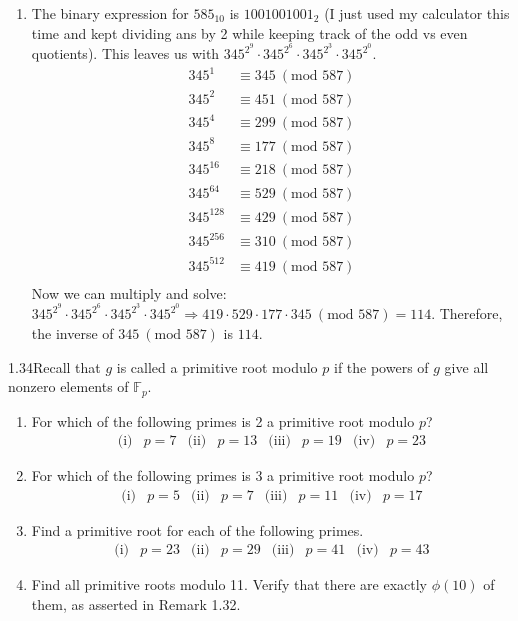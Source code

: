 {\begin{enumerate}
\begin{enumerate}[label=(\roman*)]
        \item The binary expression for \(585_{10}\) is \(1001001001_2\) (I just used my calculator this time and kept dividing ans by 2 while keeping track of the odd vs even quotients). This leaves us with \(345^{2^9} \cdot 345^{2^6} \cdot 345^{2^3} \cdot 345^{2^0}\).
        \begin{align*}            
            345^1 &\equiv 345 \ (\text{mod } 587) \\
            345^2 &\equiv 451 \ (\text{mod } 587) \\
            345^4 &\equiv 299 \ (\text{mod } 587) \\
            345^8 &\equiv 177 \ (\text{mod } 587) \\
            345^{16} &\equiv 218 \ (\text{mod } 587) \\
            345^{64} &\equiv 529 \ (\text{mod } 587) \\
            345^{128} &\equiv 429 \ (\text{mod } 587) \\
            345^{256} &\equiv 310 \ (\text{mod } 587) \\
            345^{512} &\equiv 419 \ (\text{mod } 587) \\
        \end{align*}
        Now we can multiply and solve: \(345^{2^9} \cdot 345^{2^6} \cdot 345^{2^3} \cdot 345^{2^0} \Rightarrow 419 \cdot 529 \cdot 177 \cdot 345 \ (\text{mod } 587) = 114\). Therefore, the inverse of \(345 \ (\text{mod } 587)\) is \(114\).
    \end{enumerate}
\end{enumerate}
}

\begin{exercise}
    {1.34}Recall that \( g \) is called a primitive root modulo \( p \) if the powers of \( g \) give all nonzero elements of \( \mathbb{F}_p \).
\begin{enumerate}[label=(\alph*)]
    \item For which of the following primes is 2 a primitive root modulo \( p \)?
    \[
    \begin{array}{llllllll}
    \text{(i)}&p = 7 & \text{(ii)}&p = 13 & \text{(iii)}&p = 19 & \text{(iv)}&p = 23
    \end{array}
    \]
    \item For which of the following primes is 3 a primitive root modulo \( p \)?
    \[
    \begin{array}{llllllll}
    \text{(i)}&p = 5 & \text{(ii)}&p = 7 & \text{(iii)}&p = 11 & \text{(iv)}&p = 17
    \end{array}
    \]
    \item Find a primitive root for each of the following primes.
    \[
    \begin{array}{llllllll}
         \text{(i)}&p = 23 & \text{(ii)}&p = 29 & \text{(iii)}&p = 41 & \text{(iv)}&p = 43  
    \end{array}
    \]
    \item Find all primitive roots modulo 11. Verify that there are exactly \(\phi(10)\) of them, as asserted in Remark 1.32.
\end{enumerate}
\end{exercise}

